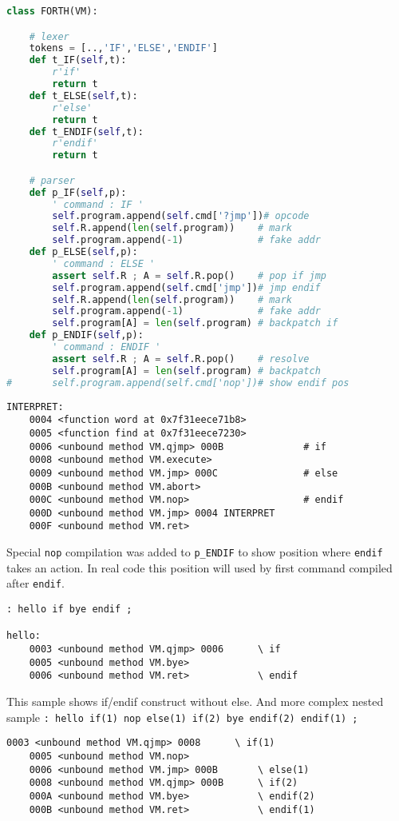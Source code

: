 \clearpage
\begin{lstlisting}[language=Python]
class FORTH(VM):

	# lexer
	tokens = [..,'IF','ELSE','ENDIF']
 	def t_IF(self,t):
 		r'if'
 		return t
 	def t_ELSE(self,t):
 		r'else'
 		return t
 	def t_ENDIF(self,t):
 		r'endif'
 		return t

 	# parser
	def p_IF(self,p):
		' command : IF '
		self.program.append(self.cmd['?jmp'])# opcode
		self.R.append(len(self.program))	# mark
		self.program.append(-1)				# fake addr
	def p_ELSE(self,p):
		' command : ELSE '
		assert self.R ; A = self.R.pop()	# pop if jmp
		self.program.append(self.cmd['jmp'])# jmp endif
		self.R.append(len(self.program))	# mark
		self.program.append(-1)				# fake addr
		self.program[A] = len(self.program)	# backpatch if
	def p_ENDIF(self,p):
		' command : ENDIF '
		assert self.R ; A = self.R.pop()	# resolve
		self.program[A] = len(self.program)	# backpatch
# 		self.program.append(self.cmd['nop'])# show endif pos
\end{lstlisting}

\begin{lstlisting}
INTERPRET: 
	0004 <function word at 0x7f31eece71b8> 
	0005 <function find at 0x7f31eece7230> 
	0006 <unbound method VM.qjmp> 000B  			# if
	0008 <unbound method VM.execute> 
	0009 <unbound method VM.jmp> 000C				# else
	000B <unbound method VM.abort> 
	000C <unbound method VM.nop>					# endif
	000D <unbound method VM.jmp> 0004 INTERPRET 
	000F <unbound method VM.ret>
\end{lstlisting}
Special \verb|nop| compilation was added to \verb|p_ENDIF| to show position
where \verb|endif| takes an action. In real code this position will used by 
first command compiled after \verb|endif|.

\clearpage
\begin{lstlisting}[language=Forth]
: hello if bye endif ;

hello: 
	0003 <unbound method VM.qjmp> 0006		\ if
	0005 <unbound method VM.bye> 
	0006 <unbound method VM.ret>			\ endif
\end{lstlisting}
This sample shows if/endif construct without else. And more complex nested
sample \verb|: hello if(1) nop else(1) if(2) bye endif(2) endif(1) ;|

\begin{lstlisting}[language=Forth]
	0003 <unbound method VM.qjmp> 0008		\ if(1)  
	0005 <unbound method VM.nop> 
	0006 <unbound method VM.jmp> 000B  		\ else(1)
	0008 <unbound method VM.qjmp> 000B		\ if(2)
	000A <unbound method VM.bye> 			\ endif(2)
	000B <unbound method VM.ret>			\ endif(1)
\end{lstlisting}
	